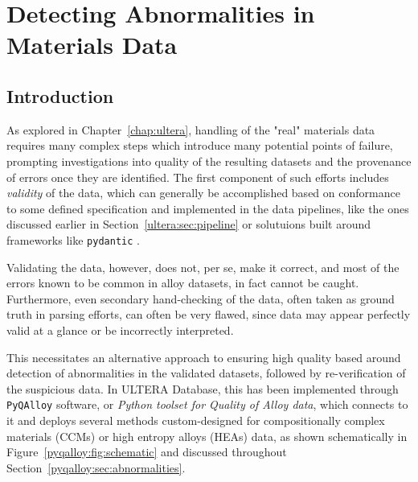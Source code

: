 \chapter{Detecting Abnormalities in Materials Data}  \label{chap:pyqalloy}


\section{Introduction} \label{pyqalloy:sec:intro}

As explored in Chapter~\ref{chap:ultera}, handling of the "real" materials data requires many complex steps which introduce many potential points of failure, prompting investigations into quality of the resulting datasets and the provenance of errors once they are identified. The first component of such efforts includes \emph{validity} of the data, which can generally be accomplished based on conformance to some defined specification and implemented in the data pipelines, like the ones discussed earlier in Section~\ref{ultera:sec:pipeline} or solutuions built around frameworks like \texttt{pydantic} \cite{WelcomePydantic}.

Validating the data, however, does not, per se, make it correct, and most of the errors known to be common in alloy datasets, in fact cannot be caught. Furthermore, even secondary hand-checking of the data, often taken as ground truth in parsing efforts, can often be very flawed, since data may appear perfectly valid at a glance or be incorrectly interpreted.

This necessitates an alternative approach to ensuring high quality based around detection of abnormalities in the validated datasets, followed by re-verification of the suspicious data. In ULTERA Database, this has been implemented through \texttt{PyQAlloy} software, or \textit{Python toolset for Quality of Alloy data}, which connects to it and deploys several methods custom-designed for compositionally complex materials (CCMs) or high entropy alloys (HEAs) data, as shown schematically in Figure~\ref{pyqalloy:fig:schematic} and discussed throughout Section~\ref{pyqalloy:sec:abnormalities}.


